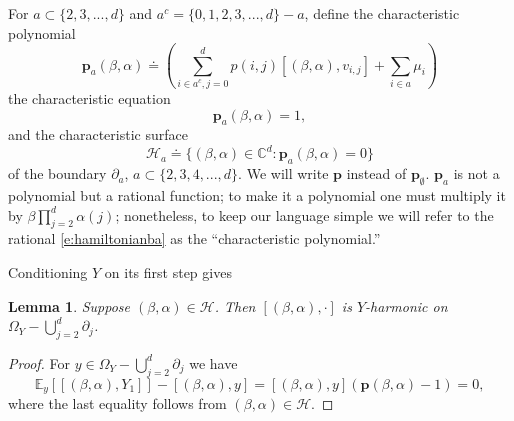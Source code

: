 \documentclass[11pt,a4paper]{article}
\newtheorem{lemma}{Lemma}
\begin{document}
For $a \subset \{2,3,...,d\}$ and $a^c = \{0,1,2,3,...,d\} - a$,
define the characteristic polynomial
\begin{equation}\label{e:hamiltonianba}
{\mathbf p}_a(\beta,\alpha)
\doteq 
\left( \sum_{ i \in a^c, j=0  }^d p(i,j) 
[(\beta,\alpha) ,v_{i,j} ]
+ 
\sum_{i \in a} \mu_i\right)
\end{equation}
the characteristic equation
\begin{equation}\label{e:chareqgenerald}
{\mathbf p}_a(\beta,\alpha) = 1,
\end{equation}
and the characteristic surface
\[
{\mathcal H}_a \doteq \{ (\beta,\alpha) \in {\mathbb C}^d: 
{\mathbf p}_a(\beta,\alpha) = 0\}
\]
of the boundary $\partial_a$, $ a \subset \{2,3,4,...,d\}.$
We will write ${\mathbf p}$ instead of ${\mathbf p}_\emptyset$.
${\mathbf p}_a$ is not a polynomial but a rational function;
to make it a polynomial one must multiply it by 
$\beta \prod_{j=2}^d \alpha(j)$; nonetheless, to keep our 
language simple
we will refer to the rational
\eqref{e:hamiltonianba} as the ``characteristic polynomial.''


Conditioning $Y$ on its first step gives
\begin{lemma}\label{l:singleterm1}
Suppose $(\beta,\alpha) \in {\mathcal H}$.
Then $[ (\beta,\alpha),\cdot]$ is $Y$-harmonic on 
$\Omega_Y - \bigcup_{j=2}^d \partial_j$.
\end{lemma}
\begin{proof}
For $y \in \Omega_Y-\bigcup_{j=2}^d \partial_j$ we have
\[
{\mathbb E}_y[ [ (\beta,\alpha), Y_1]] - [(\beta,\alpha),y] =
[(\beta,\alpha),y]
( {\mathbf p}(\beta,\alpha) -1 ) = 0,
\]
where the last equality follows from $(\beta,\alpha) \in {\mathcal H}.$
\end{proof}
\end{document}
